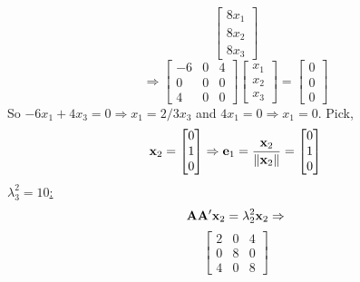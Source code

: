 \begin{enumerate}[label=(\alph*)]
\[\begin{bmatrix}
                    8x_1 \\
                    8x_2 \\
                    8x_3
                \end{bmatrix}
            \]
            \[
                \Rightarrow
                \begin{bmatrix}
                    -6 & 0 & 4 \\
                    0 & 0 & 0 \\
                    4 & 0 & 0
                \end{bmatrix}
                \begin{bmatrix}
                    x_1 \\
                    x_2 \\
                    x_3
                \end{bmatrix}
                =
                \begin{bmatrix}
                    0 \\
                    0 \\
                    0
                \end{bmatrix}
            \]
            So $-6x_1 + 4x_3 = 0 \Rightarrow x_1 = 2/3x_3$ and $4x_1 = 0 \Rightarrow x_1 = 0$. Pick,
            \[
                \bold{x}_2
                =
                \begin{bmatrix}
                    0 \\
                    1 \\
                    0
                \end{bmatrix}
                \Rightarrow
                \bold{e}_1
                =
                \frac{\bold{x}_2}{\left\|\bold{x}_2\right\|}
                =
                \begin{bmatrix}
                    0 \\
                    1 \\
                    0
                \end{bmatrix}
            \]
            \underline{$\lambda_3^2 = 10$:}
            \[
                \bold{A}\bold{A}^\prime\bold{x}_2=\lambda_2^2\bold{x}_2
                \Rightarrow
            \]
            \[
                \begin{bmatrix}
                    2 & 0 & 4 \\
                    0 & 8 & 0 \\
                    4 & 0 & 8
                \end{bmatrix}
\]
\end{enumerate}
